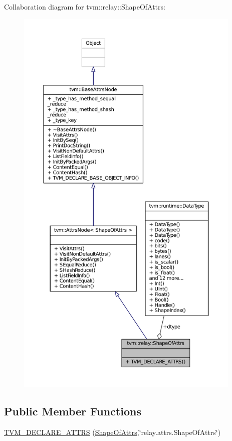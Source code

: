 Collaboration diagram for tvm\+:\+:relay\+:\+:Shape\+Of\+Attrs\+:
\nopagebreak
\begin{figure}[H]
\begin{center}
\leavevmode
\includegraphics[height=550pt]{structtvm_1_1relay_1_1ShapeOfAttrs__coll__graph}
\end{center}
\end{figure}
\subsection*{Public Member Functions}
\begin{DoxyCompactItemize}
\item 
\hyperlink{structtvm_1_1relay_1_1ShapeOfAttrs_a6e8f4295faa69f31eaf7e8c6f3961e89}{T\+V\+M\+\_\+\+D\+E\+C\+L\+A\+R\+E\+\_\+\+A\+T\+T\+RS} (\hyperlink{structtvm_1_1relay_1_1ShapeOfAttrs}{Shape\+Of\+Attrs},\char`\"{}relay.\+attrs.\+Shape\+Of\+Attrs\char`\"{})
\end{DoxyCompactItemize}
